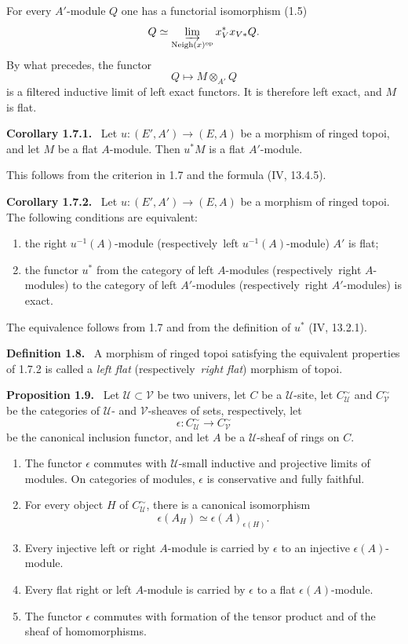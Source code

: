 \documentclass[11pt]{article}
\newcommand{\U}{\mathcal{U}}
\newcommand{\V}{\mathcal{V}}
\newcommand{\Vois}{\operatorname{Neigh}}
\newcommand{\resp}{respectively}
\newcommand{\op}{\mathrm{op}}
\newenvironment{statement}[1]{\par\medskip\noindent\textbf{#1.}\ }{\par\medskip}
\begin{document}
For every $A'$-module $Q$ one has a functorial isomorphism (1.5)
\[
Q\simeq \varinjlim_{\Vois(x)^\op}x_V^*x_{V*}Q .
\]
By what precedes, the functor
\[
Q\longmapsto M\otimes_{A'}Q
\]
is a filtered inductive limit of left exact functors. It is therefore left exact, and $M$ is flat.

\begin{statement}{Corollary 1.7.1}
Let $u:(E',A')\to(E,A)$ be a morphism of ringed topoi, and let $M$ be a flat $A$-module. Then $u^*M$ is a flat $A'$-module.
\end{statement}

This follows from the criterion in 1.7 and the formula (IV, 13.4.5).

\begin{statement}{Corollary 1.7.2}
Let $u:(E',A')\to(E,A)$ be a morphism of ringed topoi. The following conditions are equivalent:
\begin{enumerate}[label=(\roman*)]
\item the right $u^{-1}(A)$-module (\resp\ left $u^{-1}(A)$-module) $A'$ is flat;
\item the functor $u^*$ from the category of left $A$-modules (\resp\ right $A$-modules) to the category of left $A'$-modules (\resp\ right $A'$-modules) is exact.
\end{enumerate}
\end{statement}

The equivalence follows from 1.7 and from the definition of $u^*$ (IV, 13.2.1).

\begin{statement}{Definition 1.8}
A morphism of ringed topoi satisfying the equivalent properties of 1.7.2 is called a \emph{left flat} (\resp\ \emph{right flat}) morphism of topoi.
\end{statement}

\begin{statement}{Proposition 1.9}
Let $\U\subset \V$ be two univers, let $C$ be a $\U$-site, let $C^\sim_\U$ and $C^\sim_\V$ be the categories of $\U$- and $\V$-sheaves of sets, respectively, let
\[
\epsilon:C^\sim_\U\longrightarrow C^\sim_\V
\]
be the canonical inclusion functor, and let $A$ be a $\U$-sheaf of rings on $C$.
\begin{enumerate}[label=\arabic*)]
\item The functor $\epsilon$ commutes with $\U$-small inductive and projective limits of modules. On categories of modules, $\epsilon$ is conservative and fully faithful.
\item For every object $H$ of $C^\sim_\U$, there is a canonical isomorphism
\[
\epsilon(A_H)\simeq \epsilon(A)_{\epsilon(H)} .
\]
\item Every injective left or right $A$-module is carried by $\epsilon$ to an injective $\epsilon(A)$-module.
\item Every flat right or left $A$-module is carried by $\epsilon$ to a flat $\epsilon(A)$-module.
\item The functor $\epsilon$ commutes with formation of the tensor product and of the sheaf of homomorphisms.
\end{enumerate}
\end{statement}
\end{document}

